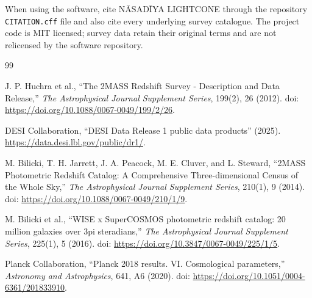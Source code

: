 \documentclass[11pt,a4paper]{article}
\begin{document}
When using the software, cite N\={A}SAD\={I}YA LIGHTCONE through the repository \texttt{CITATION.cff} file and also cite every underlying survey catalogue. The project code is MIT licensed; survey data retain their original terms and are not relicensed by the software repository.

\begin{thebibliography}{99}

J. P. Huchra et al., ``The 2MASS Redshift Survey - Description and Data Release,'' \emph{The Astrophysical Journal Supplement Series}, 199(2), 26 (2012). doi: \url{https://doi.org/10.1088/0067-0049/199/2/26}.

DESI Collaboration, ``DESI Data Release 1 public data products'' (2025). \url{https://data.desi.lbl.gov/public/dr1/}.

M. Bilicki, T. H. Jarrett, J. A. Peacock, M. E. Cluver, and L. Steward, ``2MASS Photometric Redshift Catalog: A Comprehensive Three-dimensional Census of the Whole Sky,'' \emph{The Astrophysical Journal Supplement Series}, 210(1), 9 (2014). doi: \url{https://doi.org/10.1088/0067-0049/210/1/9}.

M. Bilicki et al., ``WISE x SuperCOSMOS photometric redshift catalog: 20 million galaxies over 3pi steradians,'' \emph{The Astrophysical Journal Supplement Series}, 225(1), 5 (2016). doi: \url{https://doi.org/10.3847/0067-0049/225/1/5}.

Planck Collaboration, ``Planck 2018 results. VI. Cosmological parameters,'' \emph{Astronomy and Astrophysics}, 641, A6 (2020). doi: \url{https://doi.org/10.1051/0004-6361/201833910}.

\end{thebibliography}
\end{document}
